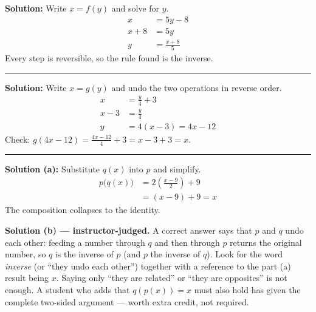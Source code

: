 \documentclass[12pt]{article}
\begin{document}




\textbf{Solution:} Write $x = f(y)$ and solve for $y$.
\begin{align*}
  x &= 5y - 8 \\
  x + 8 &= 5y \\
  y &= \frac{x + 8}{5}
\end{align*}
Every step is reversible, so the rule found is the inverse. 

\vspace{0.2cm}\noindent\rule{\linewidth}{0.2pt}


\textbf{Solution:} Write $x = g(y)$ and undo the two operations in reverse order.
\begin{align*}
  x &= \frac{y}{4} + 3 \\
  x - 3 &= \frac{y}{4} \\
  y &= 4(x - 3) = 4x - 12
\end{align*}
Check: $g(4x - 12) = \frac{4x - 12}{4} + 3 = x - 3 + 3 = x$. 

\vspace{0.2cm}\noindent\rule{\linewidth}{0.2pt}


\textbf{Solution (a):} Substitute $q(x)$ into $p$ and simplify.
\begin{align*}
  p\bigl(q(x)\bigr) &= 2\left(\frac{x - 9}{2}\right) + 9 \\
                    &= (x - 9) + 9 = x
\end{align*}
The composition collapses to the identity. 

\vspace{0.15cm}
\textbf{Solution (b) --- instructor-judged.} A correct answer says that $p$ and $q$ undo
each other: feeding a number through $q$ and then through $p$ returns the original number,
so $q$ is the inverse of $p$ (and $p$ the inverse of $q$). Look for the word \emph{inverse}
(or ``they undo each other'') together with a reference to the part (a) result being $x$.
Saying only ``they are related'' or ``they are opposites'' is not enough. A student who adds
that $q(p(x)) = x$ must also hold has given the complete two-sided argument --- worth extra
credit, not required.
\end{document}
